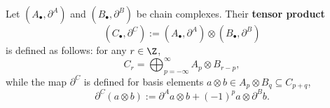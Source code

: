 \begin{definition}
  \label{idec/chain_complex/tensor_product-definition}
  Let $(A_\bullet, \partial^A)$ and $(B_\bullet, \partial^B)$
  be chain complexes.
  Their \textbf{tensor product}
  \begin{equation}
    (C_\bullet, \partial^C)
    := (A_\bullet, \partial^A) \otimes (B_\bullet, \partial^B)
  \end{equation}
  is defined as follows: for any $r \in \Z$,
  \begin{equation}
    C_r = \bigoplus_{p = -\infty}^\infty A_p \otimes B_{r - p},
  \end{equation}
  while the map $\partial^C$ is defined for basis elements
  $a \otimes b \in A_p \otimes B_q \subseteq C_{p + q}$,
  \begin{equation}
    \partial^C(a \otimes b)
    := \partial^A a \otimes b + (-1)^p a \otimes \partial^B b.
  \end{equation}
\end{definition}
